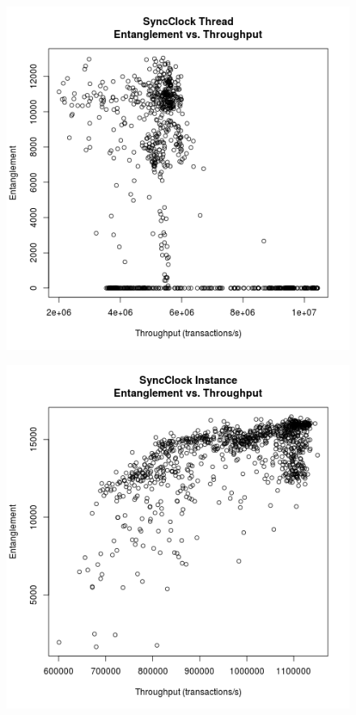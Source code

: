 \begin{figure}
\center
\includegraphics[height=.4\textheight]{sync_thread_throughput_entanglement.png}
\caption{\label{sync_thread_throughput_entanglement}}
\end{figure}

\begin{figure}
\center
\includegraphics[height=.4\textheight]{sync_instance_throughput_entanglement.png}
\caption{\label{sync_instance_throughput_entanglement}}
\end{figure}

